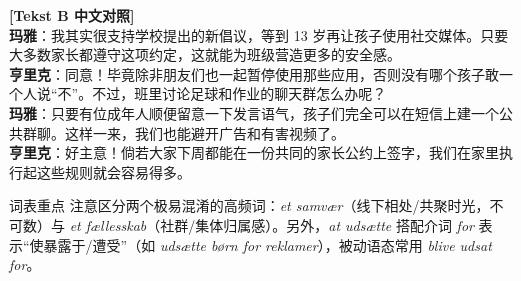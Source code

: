 \begin{transbox}
\small
\textbf{\color{NCDTeal}[Tekst B 中文对照]}\\
\textbf{玛雅}：我其实很支持学校提出的新倡议，等到 13 岁再让孩子使用社交媒体。只要大多数家长都遵守这项约定，这就能为班级营造更多的安全感。\\
\textbf{亨里克}：同意！毕竟除非朋友们也一起暂停使用那些应用，否则没有哪个孩子敢一个人说“不”。不过，班里讨论足球和作业的聊天群怎么办呢？\\
\textbf{玛雅}：只要有位成年人顺便留意一下发言语气，孩子们完全可以在短信上建一个公共群聊。这样一来，我们也能避开广告和有害视频了。\\
\textbf{亨里克}：好主意！倘若大家下周都能在一份共同的家长公约上签字，我们在家里执行起这些规则就会容易得多。
\end{transbox}


\begin{tipbox}{词表重点}
注意区分两个极易混淆的高频词：\textit{et samvær}（线下相处/共聚时光，不可数）与 \textit{et fællesskab}（社群/集体归属感）。另外，\textit{at udsætte} 搭配介词 \textit{for} 表示“使暴露于/遭受”（如 \textit{udsætte børn for reklamer}），被动语态常用 \textit{blive udsat for}。
\end{tipbox}

